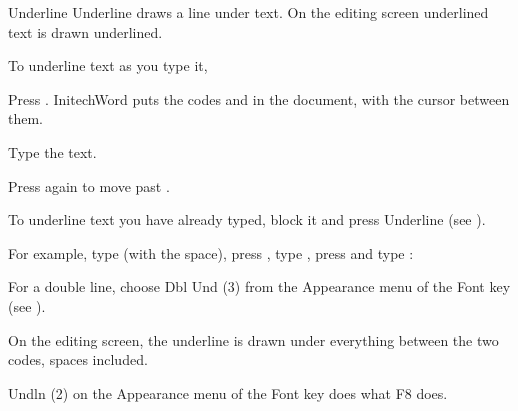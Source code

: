 \begin{Feature}{Underline}
Underline draws a line under text.  On the editing screen underlined text is
drawn underlined.

To underline text as you type it,
\begin{WPSteps}
\item Press .  InitechWord puts the codes \Code{[UND]} and
\Code{[und]} in the document, with the cursor between them.
\item Type the text.
\item Press  again to move past \Code{[und]}.
\end{WPSteps}
\begin{WPNote}To underline text you have already typed, block it and press
Underline (see ).\end{WPNote}

For example, type  (with the space), press
, type , press 
and type :
\EndReplay

\Notes
{}
For a double line, choose Dbl Und (3) from the Appearance menu of the Font
key (see ).

On the editing screen, the underline is drawn under everything between the
two codes, spaces included.

Undln (2) on the Appearance menu of the Font key does what F8 does.

\end{Feature}

